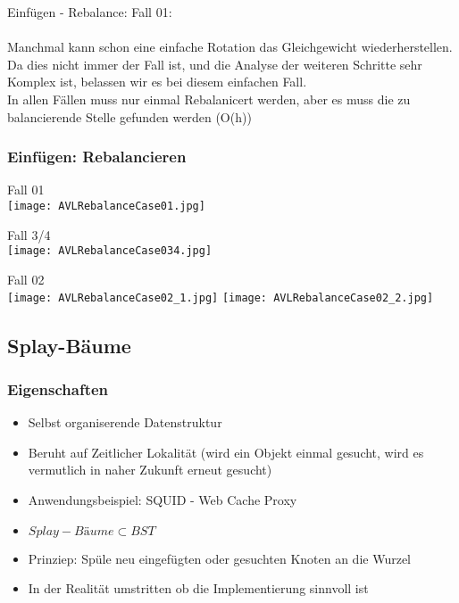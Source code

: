 			\noindent Einfügen - Rebalance: Fall 01:
			\noindent \paragraph{} Manchmal kann schon eine einfache Rotation das Gleichgewicht wiederherstellen.
			Da dies nicht immer der Fall ist, und die Analyse der weiteren Schritte sehr Komplex ist, 
			belassen wir es bei diesem einfachen Fall. \\
			In allen Fällen muss nur einmal Rebalanicert werden, aber es muss die zu balancierende Stelle
			gefunden werden (O(h))

			
		\subsubsection{Einfügen: Rebalancieren}
			\begin{minipage}[t]{0.5\textwidth}
				\begin{center}
					Fall 01 \\
					\texttt{[image: AVLRebalanceCase01.jpg]}
				\end{center}
			\end{minipage}
			\hfill\vline\hfill
			\begin{minipage}[t]{0.45\textwidth}
				\begin{center}
					Fall 3/4 \\
					\texttt{[image: AVLRebalanceCase034.jpg]}
				\end{center}
			\end{minipage}
			\centerline{\noindent\makebox[0.5\linewidth]{\rule{0.9\paperwidth}{0.4pt}}}
			\begin{center}
				Fall 02 \\
				\texttt{[image: AVLRebalanceCase02\_1.jpg]}
				\texttt{[image: AVLRebalanceCase02\_2.jpg]}
			\end{center}

			
	\newpage
	\subsection{Splay-Bäume}
		\subsubsection{Eigenschaften}
			\begin{itemize}
				\item Selbst organiserende Datenstruktur
				\item Beruht auf Zeitlicher Lokalität (wird ein Objekt einmal gesucht,
					wird es vermutlich in naher Zukunft erneut gesucht)
				\item Anwendungsbeispiel: SQUID - Web Cache Proxy
				\item $Splay-Bäume \subset BST$
				\item Prinziep: Spüle neu eingefügten oder gesuchten Knoten an die Wurzel
				\item In der Realität umstritten ob die Implementierung sinnvoll ist
			\end{itemize}

